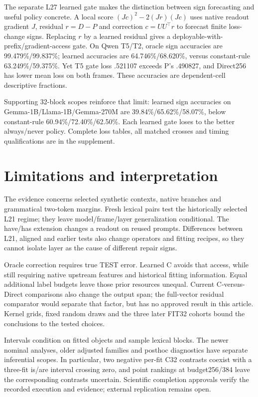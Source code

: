 \documentclass[11pt]{article}
\begin{document}
The separate L27 learned gate makes the distinction between sign forecasting and useful policy concrete. A local score $(Jc)^2-2(Jr)(Jc)$ uses native readout gradient $J$, residual $r=D-P$ and correction $c=UU^\top r$ to forecast finite loss-change signs. Replacing $r$ by a learned residual gives a deployable-with-prefix/gradient-access gate. On Qwen T5/T2, oracle sign accuracies are 99.479\%/99.837\%; learned accuracies are 64.746\%/68.620\%, versus constant-rule 63.249\%/59.375\%. Yet T5 gate loss .521107 exceeds P's .490827, and Direct256 has lower mean loss on both frames. These accuracies are dependent-cell descriptive fractions.

Supporting 32-block scopes reinforce that limit: learned sign accuracies on Gemma-1B/Llama-1B/Gemma-270M are 39.84\%/65.62\%/58.07\%, below constant-rule 60.94\%/72.40\%/62.50\%. Each learned gate loses to the better always/never policy. Complete loss tables, all matched crosses and timing qualifications are in the supplement.

\section{Limitations and interpretation}
The evidence concerns selected synthetic contexts, native branches and grammatical two-token margins. Fresh lexical pairs test the historically selected L21 regime; they leave model/frame/layer generalization conditional. The have/has extension changes a readout on reused prompts. Differences between L21, aligned and earlier tests also change operators and fitting recipes, so they cannot isolate layer as the cause of different repair signs.

Oracle correction requires true TEST error. Learned C avoids that access, while still requiring native upstream features and historical fitting information. Equal additional label budgets leave those prior resources unequal. Current C-versus-Direct comparisons also change the output span; the full-vector residual comparator would separate that factor, but has no approved result in this article. Kernel grids, fixed random draws and the three later FIT32 cohorts bound the conclusions to the tested choices.

Intervals condition on fitted objects and sample lexical blocks. The newer nominal analyses, older adjusted families and posthoc diagnostics have separate inferential scopes. In particular, two negative per-fit C32 contrasts coexist with a three-fit is/are interval crossing zero, and point rankings at budget256/384 leave the corresponding contrasts uncertain. Scientific completion approvals verify the recorded execution and evidence; external replication remains open.
\end{document}
